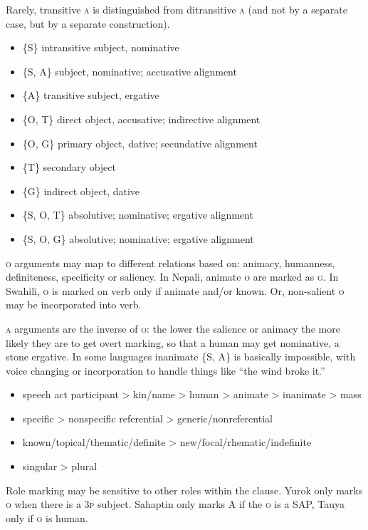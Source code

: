 \documentclass[11pt]{article}
\newcommand{\I}[1]{\textsc{#1}}   %
\newenvironment{grammarlist}%
 {\begin{itemize}\addtolength{\itemsep}{-0.5\baselineskip}\ignorespaces}%
 {\end{itemize}\ignorespacesafterend}
\begin{document}
Rarely, transitive \I{a} is distinguished from ditransitive \I{a} (and
not by a separate case, but by a separate construction).

\begin{grammarlist}
  \item \{\I{S}\} intransitive subject, nominative
  \item \{\I{S, A}\} subject, nominative; accusative alignment
  \item \{\I{A}\} transitive subject, ergative
  \item \{\I{O, T}\} direct object, accusative; indirective alignment
  \item \{\I{O, G}\} primary object, dative; secundative alignment
  \item \{\I{T}\} secondary object
  \item \{\I{G}\} indirect object, dative
  \item \{\I{S, O, T}\} absolutive; nominative; ergative alignment
  \item \{\I{S, O, G}\} absolutive; nominative; ergative alignment
\end{grammarlist}

\I{o} arguments may map to different relations based on: animacy,
humanness, definiteness, specificity or saliency.  In Nepali, animate
\I{o} are marked as \I{g}.  In Swahili, \I{o} is marked on verb only
if animate and/or known.  Or, non-salient \I{o} may be incorporated
into verb.

\I{a} arguments are the inverse of \I{o}: the lower the salience or
animacy the more likely they are to get overt marking, so that a human
may get nominative, a stone ergative.  In some languages inanimate
\{\I{S, A}\} is basically impossible, with voice changing or
incorporation to handle things like ``the wind broke it.''

\begin{grammarlist}
  \item speech act participant > kin/name > human > animate >
    inanimate > mass
  \item specific > nonspecific referential > generic/nonreferential
  \item known/topical/thematic/definite > new/focal/rhematic/indefinite
  \item singular > plural
\end{grammarlist}

Role marking may be sensitive to other roles within the clause.  Yurok
only marks \I{o} when there is a \I{3p} subject.  Sahaptin only marks
\I{A} if the \I{o} is a SAP, Tauya only if \I{o} is human.
\end{document}
